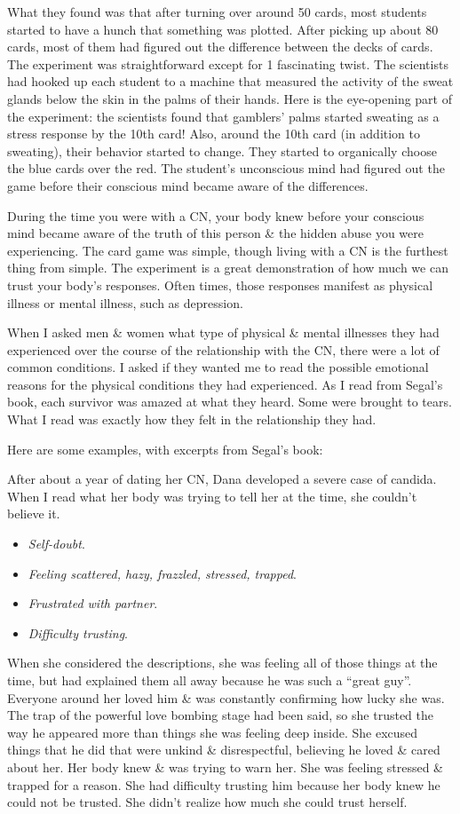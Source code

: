 \documentclass{article}
\numberwithin{equation}{section}
\begin{document}
What they found was that after turning over around 50 cards, most students started to have a hunch that something was plotted. After picking up about 80 cards, most of them had figured out the difference between the decks of cards. The experiment was straightforward except for 1 fascinating twist. The scientists had hooked up each student to a machine that measured the activity of the sweat glands below the skin in the palms of their hands. Here is the eye-opening part of the experiment: the scientists found that gamblers' palms started sweating as a stress response by the 10th card! Also, around the 10th card (in addition to sweating), their behavior started to change. They started to organically choose the blue cards over the red. The student's unconscious mind had figured out the game before their conscious mind became aware of the differences.

During the time you were with a CN, your body knew before your conscious mind became aware of the truth of this person \& the hidden abuse you were experiencing. The card game was simple, though living with a CN is the furthest thing from simple. The experiment is a great demonstration of how much we can trust your body's responses. Often times, those responses manifest as physical illness or mental illness, such as depression.

When I asked men \& women what type of physical \& mental illnesses they had experienced over the course of the relationship with the CN, there were a lot of common conditions. I asked if they wanted me to read the possible emotional reasons for the physical conditions they had experienced. As I read from Segal's book, each survivor was amazed at what they heard. Some were brought to tears. What I read was exactly how they felt in the relationship they had.

Here are some examples, with excerpts from Segal's book:


After about a year of dating her CN, Dana developed a severe case of candida. When I read what her body was trying to tell her at the time, she couldn't believe it.
\begin{itemize}
	\item \textit{Self-doubt}.
	\item \textit{Feeling scattered, hazy, frazzled, stressed, trapped}.
	\item \textit{Frustrated with partner}.
	\item \textit{Difficulty trusting}.
\end{itemize}
When she considered the descriptions, she was feeling all of those things at the time, but had explained them all away because he was such a ``great guy''. Everyone around her loved him \& was constantly confirming how lucky she was. The trap of the powerful love bombing stage had been said, so she trusted the way he appeared more than things she was feeling deep inside. She excused things that he did that were unkind \& disrespectful, believing he loved \& cared about her. Her body knew \& was trying to warn her. She was feeling stressed \& trapped for a reason. She had difficulty trusting him because her body knew he could not be trusted. She didn't realize how much she could trust herself.
\end{document}
